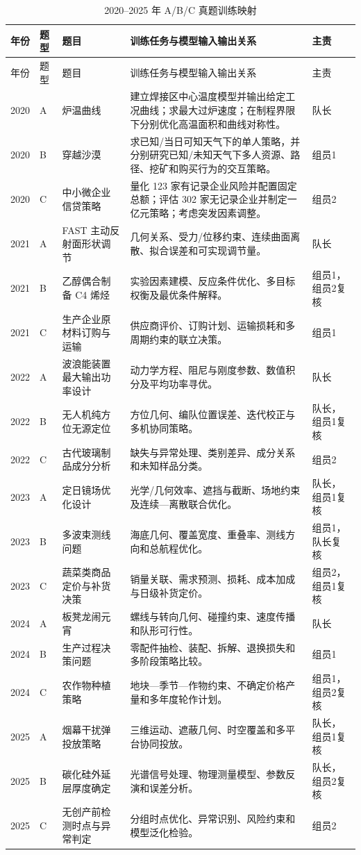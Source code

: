 \documentclass[UTF8,a4paper,12pt]{ctexart}
\begin{document}
\begin{longtable}{p{1.2cm}p{1.3cm}p{3.3cm}p{6.0cm}p{1.9cm}}
\caption{2020--2025 年 A/B/C 真题训练映射}\label{tab:problems}\\
\toprule
年份 & 题型 & 题目 & 训练任务与模型输入输出关系 & 主责\\
\midrule
\endfirsthead
\toprule
年份 & 题型 & 题目 & 训练任务与模型输入输出关系 & 主责\\
\midrule
\endhead
2020 & A & 炉温曲线 & 建立焊接区中心温度模型并输出给定工况曲线；求最大过炉速度；在制程界限下分别优化高温面积和曲线对称性。 & 队长\\
2020 & B & 穿越沙漠 & 求已知/当日可知天气下的单人策略，并分别研究已知/未知天气下多人资源、路径、挖矿和购买行为的交互策略。 & 组员1\\
2020 & C & 中小微企业信贷策略 & 量化 123 家有记录企业风险并配置固定总额；评估 302 家无记录企业并制定一亿元策略；考虑突发因素调整。 & 组员2\\
2021 & A & FAST 主动反射面形状调节 & 几何关系、受力/位移约束、连续曲面离散、拟合误差和可实现调节量。 & 队长\\
2021 & B & 乙醇偶合制备 C4 烯烃 & 实验因素建模、反应条件优化、多目标权衡及最优条件解释。 & 组员1，组员2复核\\
2021 & C & 生产企业原材料订购与运输 & 供应商评价、订购计划、运输损耗和多周期约束的联立决策。 & 组员1\\
2022 & A & 波浪能装置最大输出功率设计 & 动力学方程、阻尼与刚度参数、数值积分及平均功率寻优。 & 队长\\
2022 & B & 无人机纯方位无源定位 & 方位几何、编队位置误差、迭代校正与多机协同策略。 & 队长，组员1复核\\
2022 & C & 古代玻璃制品成分分析 & 缺失与异常处理、类别差异、成分关系和未知样品分类。 & 组员2\\
2023 & A & 定日镜场优化设计 & 光学/几何效率、遮挡与截断、场地约束及连续—离散联合优化。 & 队长，组员1复核\\
2023 & B & 多波束测线问题 & 海底几何、覆盖宽度、重叠率、测线方向和总航程优化。 & 组员1，队长复核\\
2023 & C & 蔬菜类商品定价与补货决策 & 销量关联、需求预测、损耗、成本加成与日级补货定价。 & 组员2，组员1复核\\
2024 & A & 板凳龙闹元宵 & 螺线与转向几何、碰撞约束、速度传播和队形可行性。 & 队长\\
2024 & B & 生产过程决策问题 & 零配件抽检、装配、拆解、退换损失和多阶段策略比较。 & 组员1\\
2024 & C & 农作物种植策略 & 地块—季节—作物约束、不确定价格产量和多年度轮作计划。 & 组员1，组员2复核\\
2025 & A & 烟幕干扰弹投放策略 & 三维运动、遮蔽几何、时空覆盖和多平台协同投放。 & 队长，组员1复核\\
2025 & B & 碳化硅外延层厚度确定 & 光谱信号处理、物理测量模型、参数反演和误差分析。 & 队长，组员2复核\\
2025 & C & 无创产前检测时点与异常判定 & 分组时点优化、异常识别、风险约束和模型泛化检验。 & 组员2\\
\bottomrule
\end{longtable}
\end{document}
